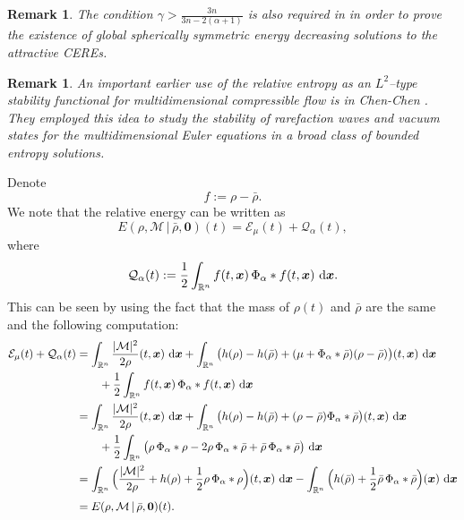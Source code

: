\documentclass[reqno,11pt]{amsart}
\numberwithin{equation}{section}
\newtheorem{remark}[theorem]{Remark}
\theoremstyle{definition}
\def\dd{{\, \rm d}}
\begin{document}
\medskip
\begin{remark}
The condition $\gamma > \frac{3n}{3n - 2(\alpha + 1)}$ is also required in 
 {\rm\cite{Carrillo2025}} in order to prove the existence of global spherically symmetric energy decreasing
 solutions to the attractive CEREs.
\end{remark}

\begin{remark}
An important earlier use of the relative entropy as an $L^2$--type stability
functional for multidimensional compressible flow is in {\rm Chen-Chen \cite{ChenChen2007}}. They employed this idea to study the stability
of rarefaction waves and vacuum states for the multidimensional Euler
equations in a broad class of bounded entropy solutions.
\end{remark}

Denote $$f:=\rho-\bar\rho.$$ We note that the relative energy can be written as 
\begin{equation*}
E(\rho,\mathcal{M}\, | \, \bar{\rho}, \boldsymbol{0})(t)=\mathcal E_\mu(t)+\mathcal Q_\alpha(t),
\end{equation*}
where $$ \mathcal Q_\alpha(t)
 :=\frac12\int_{\mathbb R^n} f(t,\boldsymbol{x})\,\Phi_\alpha*f(t,\boldsymbol{x})\,\dd\boldsymbol{x}.$$
 This can be seen by using the fact that the mass of $\rho(t)$ and $\bar\rho$ are the same and the following computation:
 \begin{align*}
    \mathcal{E}_\mu(t)+\mathcal Q_\alpha(t) & = \int_{\mathbb R^n} \frac{|\mathcal M|^2}{2\rho}(t,\boldsymbol{x})\,\dd\boldsymbol{x} + \int_{\mathbb R^n}\big(h(\rho)-h(\bar\rho)+(\mu + \Phi_\alpha * \bar\rho)(\rho-\bar\rho)\big)(t,\boldsymbol{x})\,\dd\boldsymbol{x} \\
    & \qquad + \frac12\int_{\mathbb R^n} f(t,\boldsymbol{x})\,\Phi_\alpha*f(t,\boldsymbol{x})\,\dd\boldsymbol{x} \\
    & = \int_{\mathbb R^n} \frac{|\mathcal M|^2}{2\rho}(t,\boldsymbol{x})\,\dd\boldsymbol{x} + \int_{\mathbb R^n}\big(h(\rho)-h(\bar\rho)+(\rho-\bar\rho)\Phi_\alpha * \bar\rho\big)(t,\boldsymbol{x})\,\dd\boldsymbol{x} \\
    & \qquad + \frac{1}{2} \int_{\mathbb R^n} \big (\rho\,\Phi_\alpha*\rho - 2 \rho\,\Phi_\alpha*\bar \rho + \bar\rho\,\Phi_\alpha*\bar\rho \big ) \,\dd\boldsymbol{x} \\
    & = \int_{\mathbb R^n} \Big ( \frac{|\mathcal M|^2}{2\rho} + h(\rho)+\frac{1}{2}\rho\,\Phi_\alpha * \rho\Big)(t,\boldsymbol{x})\,\dd\boldsymbol{x} - \int_{\mathbb R^n} \Big ( h(\bar\rho)+\frac{1}{2}\bar\rho\,\Phi_\alpha * \bar\rho\Big)(\boldsymbol{x})\,\dd\boldsymbol{x} \\[1mm]
    & = E(\rho,\mathcal{M}\, | \, \bar{\rho}, \boldsymbol{0})(t).
 \end{align*}
\end{document}
